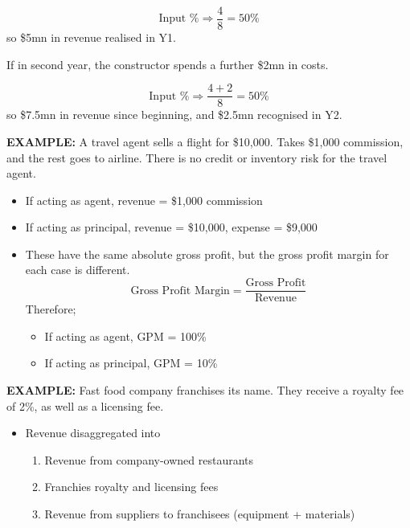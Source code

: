 \documentclass[../notes_compiled.tex]{subfiles}
\begin{document}
\begin{itemize}
\begin{itemize}
{}
{\color{RoyalBlue}
\begin{equation*}
\text{Input \%} \Rightarrow \frac{4}{8} = 50\%
\end{equation*}
so \$5mn in revenue realised in Y1.
}
{\color{RedViolet}
\item If in second year, the constructor spends a further \$2mn in costs.
}
{\color{RoyalBlue}
\begin{equation*}
\text{Input \%} \Rightarrow \frac{4+2}{8} = 50\%
\end{equation*}
so \$7.5mn in revenue since beginning, and \$2.5mn recognised in Y2.
}
\end{itemize}
{\color{RedViolet}
\item[] \textbf{EXAMPLE:} A travel agent sells a flight for \$10,000. Takes \$1,000 commission, and the rest goes to airline. There is no credit or inventory risk for the travel agent.
}
{\color{RoyalBlue}
\begin{itemize}
\item If acting as agent, revenue = \$1,000 commission
\item If acting as principal, revenue = \$10,000, expense = \$9,000
\item[] These have the same absolute gross profit, but the gross profit margin for each case is different.
\begin{equation*}
\text{Gross Profit Margin} = \frac{\text{Gross Profit}}{\text{Revenue}}
\end{equation*}
Therefore;
\begin{itemize}
\item If acting as agent, GPM = 100\%
\item If acting as principal, GPM = 10\%
\end{itemize}
\end{itemize}
}
{\color{RedViolet}
\item[] \textbf{EXAMPLE:} Fast food company franchises its name. They receive a royalty fee of 2\%, as well as a licensing fee.
}
{\color{RoyalBlue}
\begin{itemize}
\item Revenue disaggregated into
\begin{enumerate}
\item Revenue from company-owned restaurants
\item Franchies royalty and licensing fees
\item Revenue from suppliers to franchisees (equipment + materials)
\end{enumerate}
\end{itemize}
}
\end{itemize}
\end{document}
